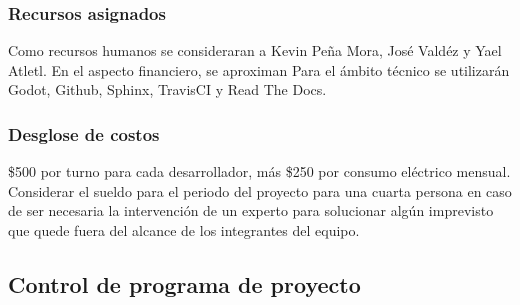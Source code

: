 \documentclass[]{article}
\begin{document}
\subsubsection{Recursos asignados}
Como recursos humanos se consideraran a Kevin Pe\~na Mora, Jos\'e Vald\'ez y Yael Atletl. En el aspecto financiero, se aproximan 
Para el \'ambito t\'ecnico se utilizar\'an Godot, Github, Sphinx, TravisCI y Read The Docs.

\subsubsection{Desglose de costos}
\$500 por turno para cada desarrollador, m\'as \$250 por consumo el\'ectrico mensual. 
Considerar el sueldo para el periodo del proyecto para una cuarta persona en caso de ser necesaria la intervenci\'on de un experto para solucionar alg\'un imprevisto que quede fuera del alcance de los integrantes del equipo.

\subsection{Control de programa de proyecto} %
\end{document}
